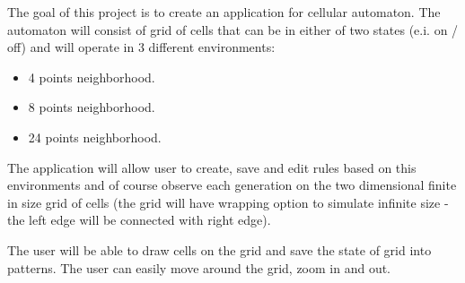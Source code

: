 \documentclass{article}
\begin{document}
\hspace{15pt}The goal of this project is to create an application for cellular automaton. The automaton will consist of grid of cells that can be in either of two states
(e.i. on / off) and will operate in 3 different environments:
\begin{itemize}
	\item 4 points neighborhood.
	\item 8 points neighborhood.
	\item 24 points neighborhood.
\end{itemize}

\par The application will allow user to create, save and edit rules based on this environments and of course observe each generation on the two dimensional finite in size grid of cells
(the grid will have wrapping option to simulate infinite size - the left edge will be connected with right edge).

\par The user will be able to draw cells on the grid and save the state of grid into patterns.
The user can easily move around the grid, zoom in and out.
\end{document}
